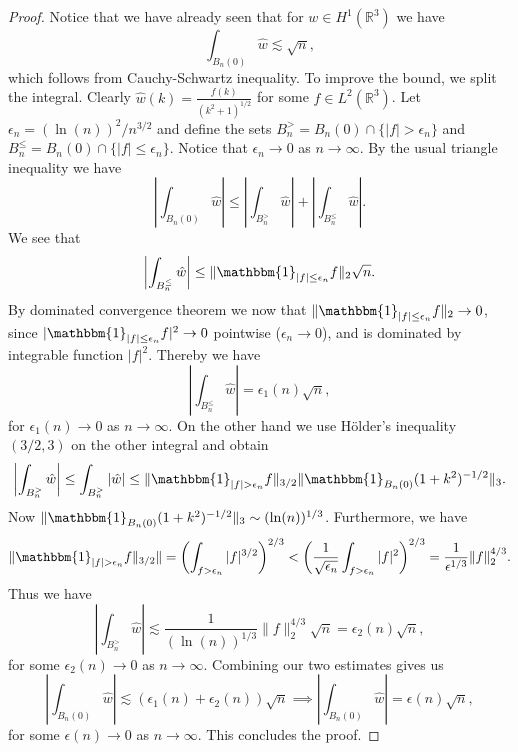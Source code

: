 \documentclass[a4paper,11pt]{article}
\newcommand{\R}{\mathbb{R}}
\numberwithin{equation}{section}
\begin{document}
\begin{proof}
	Notice that we have already seen that for $ w\in H^1(\R^3) $ we have \begin{equation}
	\int_{B_n(0)}\hat{w}\lesssim\sqrt{n},
	\end{equation}
	which follows from Cauchy-Schwartz inequality. To improve the bound, we split the integral. Clearly $ \hat{w}(k)=\frac{f(k)}{(k^2+1)^{1/2}} $ for some $ f\in L^2(\R^3) $. Let $ \epsilon_n=(\ln(n))^2/n^{3/2} $ and define the sets $ B_n^>=B_n(0)\cap\{|f|>\epsilon_n\} $ and $ B_n^\leq=B_n(0)\cap\{|f|\leq\epsilon_n\}  $. Notice that $ \epsilon_n\to0 $ as $ n\to\infty $. By the usual triangle inequality we have \begin{equation}
	\left\lvert\int_{B_n(0)}\hat{w}\right\rvert\leq\left\lvert\int_{B_n^>}\hat{w}\right\rvert+\left\lvert\int_{B_n^\leq}\hat{w}\right\rvert.
	\end{equation}
	We see that \begin{equation}
	\left\lvert\int_{B_n^\leq}\hat{w}\right\rvert\leq\|\mathbbm{1}_{|f|\leq\epsilon_n}f\|_2\sqrt{n}.
	\end{equation}
	By dominated convergence theorem we now that $ \|\mathbbm{1}_{|f|\leq\epsilon_n}f\|_2\to 0 $, since $ |\mathbbm{1}_{|f|\leq\epsilon_n}f|^2\to0 $ pointwise ($\epsilon_n\to0$), and is dominated by integrable function $ |f|^2 $. Thereby we have \begin{equation}
	\left\lvert\int_{B_n^\leq}\hat{w}\right\rvert=\epsilon_1(n)\sqrt{n},
	\end{equation}
	for $ \epsilon_1(n)\to0 $ as $ n\to\infty $. On the other hand we use H\"older's inequality $ (3/2,3) $ on the other integral and obtain\begin{equation}
	\left\lvert\int_{B_n^>}\hat{w}\right\rvert\leq\int_{B_n^>}\left\lvert\hat{w}\right\rvert\leq\|\mathbbm{1}_{|f|>\epsilon_n}f\|_{3/2}\|\mathbbm{1}_{B_n(0)}(1+k^2)^{-1/2}\|_3.
	\end{equation}
	Now $ \|\mathbbm{1}_{B_n(0)}(1+k^2)^{-1/2}\|_3\sim(\ln(n))^{1/3} $. Furthermore, we have \begin{equation}
	\|\mathbbm{1}_{|f|>\epsilon_n}f\|_{3/2}\|=\left(\int_{f>\epsilon_n}|f|^{3/2}\right)^{2/3}<\left(\frac{1}{\sqrt{\epsilon_n}}\int_{f>\epsilon_n}|f|^{2}\right)^{2/3}=\frac{1}{\epsilon^{1/3}}\|f\|_2^{4/3}.
	\end{equation}
	Thus we have \begin{equation}
	\left\lvert\int_{B_n^>}\hat{w}\right\rvert\lesssim\frac{1}{(\ln(n))^{1/3}}\|f\|_2^{4/3}\sqrt{n}=\epsilon_2(n)\sqrt{n},
	\end{equation}
	for some $ \epsilon_2(n)\to0 $ as $ n\to\infty $. Combining our two estimates gives us \begin{equation}
	\left\lvert\int_{B_n(0)}\hat{w}\right\rvert\lesssim(\epsilon_1(n)+\epsilon_2(n))\sqrt{n}\implies \left\lvert\int_{B_n(0)}\hat{w}\right\rvert=\epsilon(n)\sqrt{n},
	\end{equation}
	for some $ \epsilon(n)\to0 $ as $ n\to\infty $. This concludes the proof.
	\end{proof}
\end{document}
